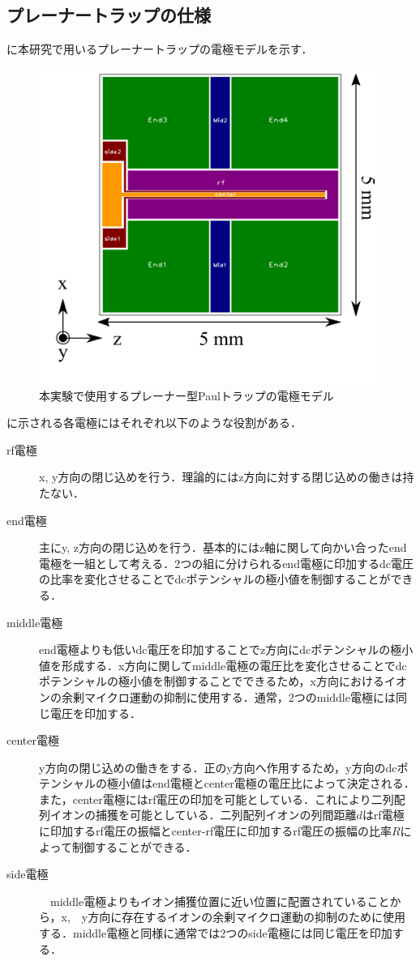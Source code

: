 \subsection{プレーナートラップの仕様}
に本研究で用いるプレーナートラップの電極モデルを示す．

\begin{figure}[h]
	\begin{center}
		\includegraphics[width = 0.5\linewidth]{./theory/figure/named_electrode.png}
		\caption{本実験で使用するプレーナー型Paulトラップの電極モデル}
		\label{fig:Named_PlanerTrap}
	\end{center}
\end{figure}

に示される各電極にはそれぞれ以下のような役割がある．
\begin{description}
\item[rf電極] x, y方向の閉じ込めを行う．理論的にはz方向に対する閉じ込めの働きは持たない．
\item[end電極] 主にy, z方向の閉じ込めを行う．基本的にはz軸に関して向かい合ったend電極を一組として考える．2つの組に分けられるend電極に印加するdc電圧の比率を変化させることでdcポテンシャルの極小値を制御することができる．
\item[middle電極] end電極よりも低いdc電圧を印加することでz方向にdcポテンシャルの極小値を形成する．x方向に関してmiddle電極の電圧比を変化させることでdcポテンシャルの極小値を制御することでできるため，x方向におけるイオンの余剰マイクロ運動の抑制に使用する．通常，2つのmiddle電極には同じ電圧を印加する．
\item[center電極] y方向の閉じ込めの働きをする．正のy方向へ作用するため，y方向のdcポテンシャルの極小値はend電極とcenter電極の電圧比によって決定される．また，center電極にはrf電圧の印加を可能としている．これにより二列配列イオンの捕獲を可能としている．二列配列イオンの列間距離$d$はrf電極に印加するrf電圧の振幅とcenter-rf電圧に印加するrf電圧の振幅の比率$R$によって制御することができる．
\item[side電極]　middle電極よりもイオン捕獲位置に近い位置に配置されていることから，x,　y方向に存在するイオンの余剰マイクロ運動の抑制のために使用する．middle電極と同様に通常では2つのside電極には同じ電圧を印加する．
\end{description}

